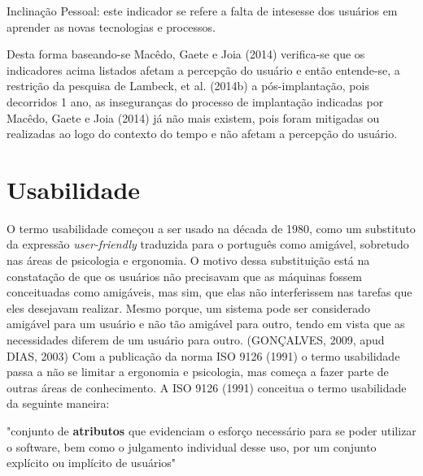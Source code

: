 	\begin{flushright}
	\begin{minipage}{.955\textwidth}
		Inclinação Pessoal: este indicador se refere a falta de intesesse dos usuários em aprender as novas tecnologias e processos.
	\end{minipage}
	\end{flushright}

Desta forma baseando-se Macêdo, Gaete e Joia (2014) verifica-se que os indicadores acima listados afetam a percepção do usuário e então entende-se, a restrição da pesquisa de Lambeck, et al. (2014b) a pós-implantação, pois decorridos 1 ano, as inseguranças do processo de implantação indicadas por Macêdo, Gaete e Joia (2014) já não mais existem, pois foram mitigadas ou realizadas ao logo do contexto do tempo e não afetam a percepção do usuário.  

\section{Usabilidade} \label{Usabilidade}

O termo usabilidade começou a ser usado na década de 1980, como um substituto da expressão \textit{user-friendly} traduzida para o português como amigável, sobretudo nas áreas de psicologia e ergonomia. O motivo dessa substituição está na constatação de que os usuários não precisavam que as máquinas fossem conceituadas como amigáveis, mas sim, que elas não interferissem nas tarefas que eles desejavam realizar. Mesmo porque, um sistema pode ser considerado amigável para um usuário e não tão amigável para outro, tendo em vista que as necessidades diferem de um usuário para outro. (GONÇALVES, 2009, apud DIAS, 2003)\newline
\indent Com a publicação da norma ISO 9126 (1991) o termo usabilidade passa a não se limitar a ergonomia e psicologia, mas começa a fazer parte de outras áreas de conhecimento.\newline
\indent A ISO 9126 (1991) conceitua o termo usabilidade da seguinte maneira:\newline

	{\raggedleft
	\hspace*{4.5cm} 
	\begin{minipage}{0.7\textwidth} 
		"conjunto de \textbf{atributos} que evidenciam o esforço necessário para se poder utilizar o software, bem como o julgamento individual desse uso, por um conjunto explícito ou implícito de usuários"	
		\newline	
	\end{minipage}
	\newline	
	\par}

